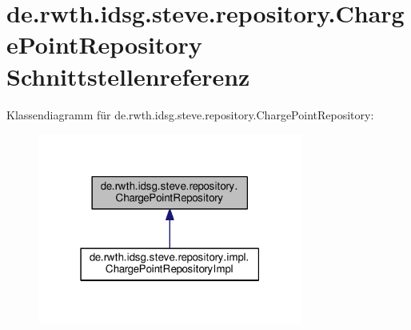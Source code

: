\hypertarget{interfacede_1_1rwth_1_1idsg_1_1steve_1_1repository_1_1_charge_point_repository}{\section{de.\+rwth.\+idsg.\+steve.\+repository.\+Charge\+Point\+Repository Schnittstellenreferenz}
\label{interfacede_1_1rwth_1_1idsg_1_1steve_1_1repository_1_1_charge_point_repository}
}


Klassendiagramm für de.\+rwth.\+idsg.\+steve.\+repository.\+Charge\+Point\+Repository\+:\nopagebreak
\begin{figure}[H]
\begin{center}
\leavevmode
\includegraphics[width=247pt]{interfacede_1_1rwth_1_1idsg_1_1steve_1_1repository_1_1_charge_point_repository__inherit__graph}
\end{center}
\end{figure}
